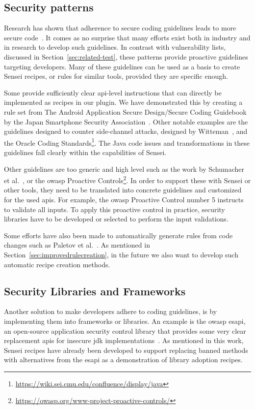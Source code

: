 \subsection{Security patterns}
Research has shown that adherence to secure coding guidelines leads to more secure code~\cite{lipfordimpact}.
It comes as no surprise that many efforts exist both in industry and in research to develop such guidelines.
In contrast with vulnerability lists, discussed in Section~\ref{sec:related-test}, these patterns provide proactive guidelines targeting developers.
Many of these guidelines can be used as a basis to create Sensei recipes, or rules for similar tools, provided they are specific enough.

Some provide sufficiently clear \gls{api}-level instructions that can directly be implemented as recipes in our plugin.
We have demonstrated this by creating a rule set from The Android Application Secure Design/Secure Coding Guidebook by the Japan Smartphone Security Association~\cite{jssec}.
Other notable examples are the guidelines designed to counter side-channel attacks, designed by Witteman~\cite{witteman2008secure}, and the Oracle Coding Standards\footnote{\url{https://wiki.sei.cmu.edu/confluence/display/java}}.
The Java code issues and transformations in these guidelines fall clearly within the capabilities of Sensei.

Other  guidelines are too generic and high level such as the work by Schumacher et al.~\cite{schumacher2013security}, or the \gls{owasp} Proactive Controls\footnote{\url{https://owasp.org/www-project-proactive-controls/}}.
In order to support these with Sensei or other tools, they need to be translated into concrete guidelines and customized for the used \glspl{api}.
For example, the \gls{owasp} Proactive Control number 5 instructs to validate all inputs.
To apply this proactive control in practice, security libraries have to be developed or selected to perform the input validations.

Some efforts have also been made to automatically generate rules from code changes such as Paletov et al.~\cite{paletov2018inferring}.
As mentioned in Section~\ref{sec:improvedrulecreation}, in the future we also want to develop such automatic recipe creation methods.

\subsection{Security Libraries and Frameworks}
Another solution to make developers adhere to coding guidelines, is by implementing them into frameworks or libraries.
An example is the \gls{owasp} \gls{esapi}, an open-source application security control library that provides some very clear replacement \glspl{api} for insecure \gls{jdk} implementations~\cite{ESAPI}.
As mentioned in this work, Sensei recipes have already been developed to support replacing banned methods with alternatives from the \gls{esapi} as a demonstration of library adoption recipes. 

